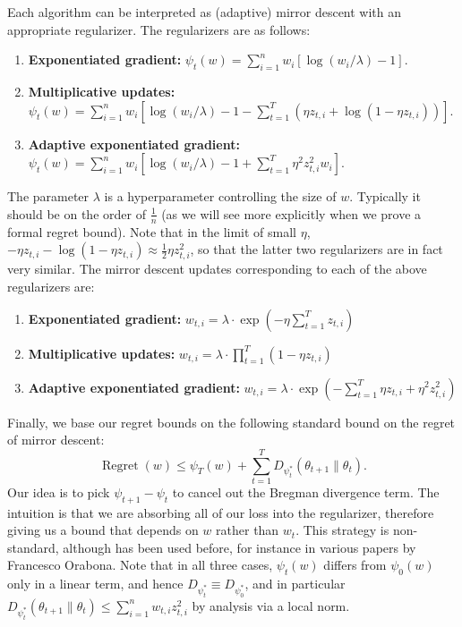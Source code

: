 \documentclass[11pt]{article}
\DeclareMathOperator{\Regret}{Regret}
\begin{document}
Each algorithm can be interpreted as (adaptive) mirror descent with an appropriate 
regularizer. The regularizers are as follows:
\begin{enumerate}
        \item \textbf{Exponentiated gradient:} $\psi_t(w) = \sum_{i=1}^n w_i[\log(w_i/\lambda)-1]$.
        \item \textbf{Multiplicative updates:} $\psi_t(w) = \sum_{i=1}^n w_i[\log(w_i/\lambda)-1-\sum_{t=1}^T (\eta z_{t,i} + \log(1-\eta z_{t,i}))]$.
        \item \textbf{Adaptive exponentiated gradient:} $\psi_t(w) = \sum_{i=1}^n w_i[\log(w_i/\lambda)-1+\sum_{t=1}^T \eta^2 z_{t,i}^2 w_i]$.
\end{enumerate}
The parameter $\lambda$ is a hyperparameter controlling the size of $w$. Typically it should be on the order of $\frac{1}{n}$ 
(as we will see more explicitly when we prove a formal regret bound). Note that in the limit of small $\eta$, 
$-\eta z_{t,i} - \log(1-\eta z_{t,i}) \approx \frac{1}{2}\eta z_{t,i}^2$, so that 
the latter two regularizers are in fact very similar. The mirror descent updates corresponding 
to each of the above regularizers are:
\begin{enumerate}
        \item \textbf{Exponentiated gradient:} $w_{t,i} = \lambda \cdot \exp\left(-\eta \sum_{t=1}^T z_{t,i}\right)$
        \item \textbf{Multiplicative updates:} $w_{t,i} = \lambda \cdot \prod_{t=1}^T (1- \eta z_{t,i})$
        \item \textbf{Adaptive exponentiated gradient:} $w_{t,i} = \lambda \cdot \exp\left(- \sum_{t=1}^T \eta z_{t,i} + \eta^2 z_{t,i}^2\right)$
\end{enumerate}
Finally, we base our regret bounds on the following standard bound on the regret of mirror descent:
\begin{equation}
        \label{eqn:bound}
        \Regret(w) \leq \psi_T(w) + \sum_{t=1}^T D_{\psi_t^*}(\theta_{t+1} \| \theta_t).
\end{equation}
Our idea is to pick $\psi_{t+1}-\psi_t$ to cancel out the Bregman divergence term. The intuition is 
that we are absorbing all of our loss into the regularizer, therefore giving us a bound that depends 
on $w$ rather than $w_t$. This strategy is non-standard, although has been used before, for instance in 
various papers by Francesco Orabona. Note that in all three cases, $\psi_t(w)$ differs from $\psi_0(w)$ 
only in a linear term, and hence $D_{\psi_t^*} \equiv D_{\psi_0^*}$, and in particular 
$D_{\psi_t^*}(\theta_{t+1} \| \theta_t) \leq \sum_{i=1}^n w_{t,i}z_{t,i}^2$ by analysis via a local norm.
\end{document}

